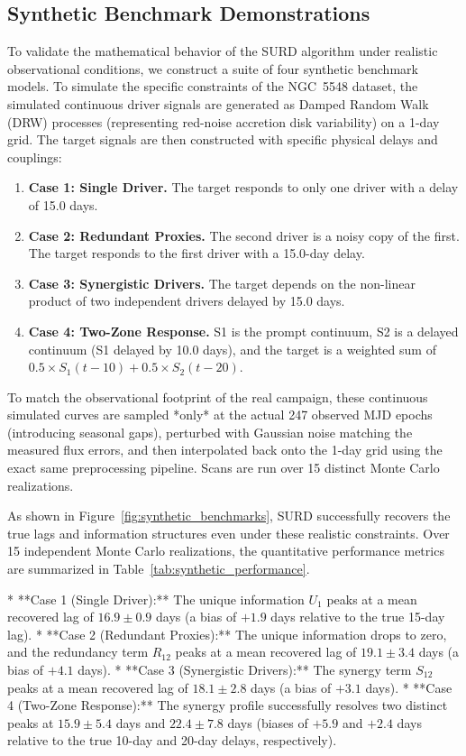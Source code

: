 \documentclass[12pt, a4paper]{article}
\begin{document}
\subsection{Synthetic Benchmark Demonstrations}
\label{sec:synthetic_benchmarks}To validate the mathematical behavior of the SURD algorithm under realistic observational conditions, we construct a suite of four synthetic benchmark models. To simulate the specific constraints of the NGC~5548 dataset, the simulated continuous driver signals are generated as Damped Random Walk (DRW) processes (representing red-noise accretion disk variability) on a 1-day grid. The target signals are then constructed with specific physical delays and couplings:
\begin{enumerate}
\item \textbf{Case 1: Single Driver.} The target responds to only one driver with a delay of 15.0 days.
\item \textbf{Case 2: Redundant Proxies.} The second driver is a noisy copy of the first. The target responds to the first driver with a 15.0-day delay.
\item \textbf{Case 3: Synergistic Drivers.} The target depends on the non-linear product of two independent drivers delayed by 15.0 days.
\item \textbf{Case 4: Two-Zone Response.} S1 is the prompt continuum, S2 is a delayed continuum (S1 delayed by 10.0 days), and the target is a weighted sum of $0.5 \times S_1(t-10) + 0.5 \times S_2(t-20)$.
\end{enumerate}

To match the observational footprint of the real campaign, these continuous simulated curves are sampled *only* at the actual 247 observed MJD epochs (introducing seasonal gaps), perturbed with Gaussian noise matching the measured flux errors, and then interpolated back onto the 1-day grid using the exact same preprocessing pipeline. Scans are run over 15 distinct Monte Carlo realizations.

As shown in Figure~\ref{fig:synthetic_benchmarks}, SURD successfully recovers the true lags and information structures even under these realistic constraints. Over 15 independent Monte Carlo realizations, the quantitative performance metrics are summarized in Table~\ref{tab:synthetic_performance}.

*   **Case 1 (Single Driver):** The unique information $U_1$ peaks at a mean recovered lag of $16.9 \pm 0.9$ days (a bias of $+1.9$ days relative to the true 15-day lag).
*   **Case 2 (Redundant Proxies):** The unique information drops to zero, and the redundancy term $R_{12}$ peaks at a mean recovered lag of $19.1 \pm 3.4$ days (a bias of $+4.1$ days).
*   **Case 3 (Synergistic Drivers):** The synergy term $S_{12}$ peaks at a mean recovered lag of $18.1 \pm 2.8$ days (a bias of $+3.1$ days).
*   **Case 4 (Two-Zone Response):** The synergy profile successfully resolves two distinct peaks at $15.9 \pm 5.4$ days and $22.4 \pm 7.8$ days (biases of $+5.9$ and $+2.4$ days relative to the true 10-day and 20-day delays, respectively).
\end{document}
